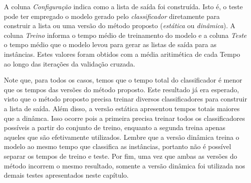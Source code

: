 A coluna \textit{Configuração} indica como a lista de saída foi construída.
Isto é, o teste pode ter empregado o modelo gerado pelo \textit{classificador} diretamente para construir a lista ou uma versão do método proposto (\textit{estática} ou \textit{dinâmica}).
A coluna \textit{Treino} informa o tempo médio de treinamento do modelo e a coluna \textit{Teste} o tempo médio que o modelo levou para gerar as listas de saída para as instâncias.
Estes valores foram obtidos com a média aritimética de cada Tempo ao longo das iterações da validação cruzada.


Note que, para todos os casos, temos que o tempo total do classificador é menor que os tempos das versões do método proposto.
Este resultado já era esperado, visto que o método proposto precisa treinar diversos classificadores para construir a lista de saída.
Além disso, a versão estática apresentou tempos totais maiores que a dinâmca.
Isso ocorre pois a primeira precisa treinar todos os classificadores possíveis a partir do conjunto de treino, enquanto a segunda treina apenas aqueles que são efetivamente utilizados.
Lembre que a versão dinâmica treina o modelo ao mesmo tempo que classifica as instâncias, portanto não é possível separar os tempos de treino e teste.
Por fim, uma vez que ambas as versões do método incorrem o mesmo resultado, somente a versão dinâmica foi utilizada nos demais testes apresentados neste capítulo.

